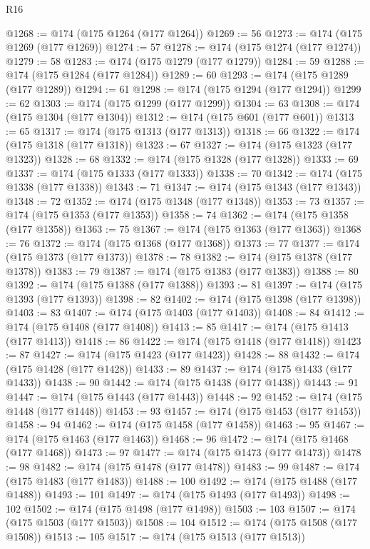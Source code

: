 \begin{lexlean}{R16}
\begin{coremodule}
@1268 := @174 (@175 @1264 (@177 @1264))
@1269 := 56
@1273 := @174 (@175 @1269 (@177 @1269))
@1274 := 57
@1278 := @174 (@175 @1274 (@177 @1274))
@1279 := 58
@1283 := @174 (@175 @1279 (@177 @1279))
@1284 := 59
@1288 := @174 (@175 @1284 (@177 @1284))
@1289 := 60
@1293 := @174 (@175 @1289 (@177 @1289))
@1294 := 61
@1298 := @174 (@175 @1294 (@177 @1294))
@1299 := 62
@1303 := @174 (@175 @1299 (@177 @1299))
@1304 := 63
@1308 := @174 (@175 @1304 (@177 @1304))
@1312 := @174 (@175 @601 (@177 @601))
@1313 := 65
@1317 := @174 (@175 @1313 (@177 @1313))
@1318 := 66
@1322 := @174 (@175 @1318 (@177 @1318))
@1323 := 67
@1327 := @174 (@175 @1323 (@177 @1323))
@1328 := 68
@1332 := @174 (@175 @1328 (@177 @1328))
@1333 := 69
@1337 := @174 (@175 @1333 (@177 @1333))
@1338 := 70
@1342 := @174 (@175 @1338 (@177 @1338))
@1343 := 71
@1347 := @174 (@175 @1343 (@177 @1343))
@1348 := 72
@1352 := @174 (@175 @1348 (@177 @1348))
@1353 := 73
@1357 := @174 (@175 @1353 (@177 @1353))
@1358 := 74
@1362 := @174 (@175 @1358 (@177 @1358))
@1363 := 75
@1367 := @174 (@175 @1363 (@177 @1363))
@1368 := 76
@1372 := @174 (@175 @1368 (@177 @1368))
@1373 := 77
@1377 := @174 (@175 @1373 (@177 @1373))
@1378 := 78
@1382 := @174 (@175 @1378 (@177 @1378))
@1383 := 79
@1387 := @174 (@175 @1383 (@177 @1383))
@1388 := 80
@1392 := @174 (@175 @1388 (@177 @1388))
@1393 := 81
@1397 := @174 (@175 @1393 (@177 @1393))
@1398 := 82
@1402 := @174 (@175 @1398 (@177 @1398))
@1403 := 83
@1407 := @174 (@175 @1403 (@177 @1403))
@1408 := 84
@1412 := @174 (@175 @1408 (@177 @1408))
@1413 := 85
@1417 := @174 (@175 @1413 (@177 @1413))
@1418 := 86
@1422 := @174 (@175 @1418 (@177 @1418))
@1423 := 87
@1427 := @174 (@175 @1423 (@177 @1423))
@1428 := 88
@1432 := @174 (@175 @1428 (@177 @1428))
@1433 := 89
@1437 := @174 (@175 @1433 (@177 @1433))
@1438 := 90
@1442 := @174 (@175 @1438 (@177 @1438))
@1443 := 91
@1447 := @174 (@175 @1443 (@177 @1443))
@1448 := 92
@1452 := @174 (@175 @1448 (@177 @1448))
@1453 := 93
@1457 := @174 (@175 @1453 (@177 @1453))
@1458 := 94
@1462 := @174 (@175 @1458 (@177 @1458))
@1463 := 95
@1467 := @174 (@175 @1463 (@177 @1463))
@1468 := 96
@1472 := @174 (@175 @1468 (@177 @1468))
@1473 := 97
@1477 := @174 (@175 @1473 (@177 @1473))
@1478 := 98
@1482 := @174 (@175 @1478 (@177 @1478))
@1483 := 99
@1487 := @174 (@175 @1483 (@177 @1483))
@1488 := 100
@1492 := @174 (@175 @1488 (@177 @1488))
@1493 := 101
@1497 := @174 (@175 @1493 (@177 @1493))
@1498 := 102
@1502 := @174 (@175 @1498 (@177 @1498))
@1503 := 103
@1507 := @174 (@175 @1503 (@177 @1503))
@1508 := 104
@1512 := @174 (@175 @1508 (@177 @1508))
@1513 := 105
@1517 := @174 (@175 @1513 (@177 @1513))

\end{coremodule}
\end{lexlean}
